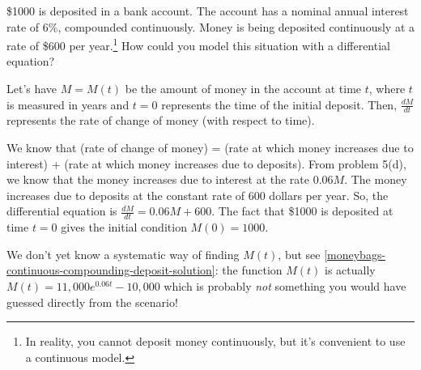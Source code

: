 \documentclass[main]{subfiles}
\begin{document}
\begin{enumerate}
   \begin{problem}[1in]
     \$1000 is deposited in a bank account.  The account has a nominal
     annual interest rate of 6\%, compounded continuously.  Money is being
     deposited continuously at a rate of \$600 per year.\footnote{In
       reality, you cannot deposit money continuously, but it's convenient
       to use a continuous model.}  How could you model this situation with a differential equation?
   \end{problem}

   \begin{solution}
     Let's have $M = M(t)$ be the amount of money in the account at time
     $t$, where $t$ is measured in years and $t = 0$ represents the time of
     the initial deposit.  Then, $\frac{dM}{dt}$ represents the rate of
     change of money (with respect to time).

     We know that (rate of change of money) = (rate at which money
     increases due to interest) + (rate at which money increases due to
     deposits).  From problem 5(d), we know that the money increases due to interest at the rate $0.06M$.
     The money increases due to deposits at the constant rate of $600$
     dollars per year.  So, the differential equation is
     $\boxed{\frac{dM}{dt} = 0.06M + 600}$.  The fact that \$1000 is
     deposited at time $t = 0$ gives the initial condition $\boxed{M(0) =
       1000}$.
    
     We don't yet know a systematic way of finding $M(t)$, but see
     \ref{moneybags-continuous-compounding-deposit-solution}: the function
     $M(t)$ is actually $M(t) = 11,000 e^{0.06 t} - 10,000$ which is
     probably \textit{not} something you would have guessed directly from
     the scenario!
   \end{solution}


  


\end{enumerate}
\end{document}
